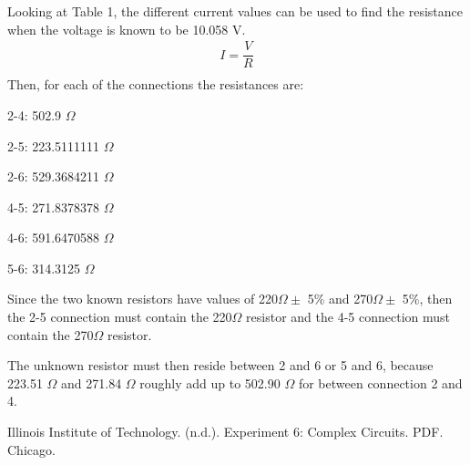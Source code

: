 \documentclass [12pt, letterpaper, twoside] {article}
\begin{document}
Looking at Table 1, the different current values can be used to find the resistance when the voltage is known to be 10.058 V.
\begin{equation}
  \begin{split}
    I = \dfrac{V}{R} \\
  \end{split}
\end{equation}
Then, for each of the connections the resistances are:

2-4: 502.9 \(\Omega\)

2-5: 223.5111111 \(\Omega\)

2-6: 529.3684211 \(\Omega\)

4-5: 271.8378378 \(\Omega\)

4-6: 591.6470588 \(\Omega\)

5-6: 314.3125 \(\Omega\)

Since the two known resistors have values of 220\(\Omega\pm\) 5\% and 270\(\Omega\pm\) 5\%, then the 2-5 connection must contain the 220\(\Omega\) resistor and the 4-5 connection must contain the 270\(\Omega\) resistor.

The unknown resistor must then reside between 2 and 6 or 5 and 6, because 223.51 \(\Omega\) and 271.84 \(\Omega\) roughly add up to 502.90 \(\Omega\) for between connection 2 and 4.

  Illinois Institute of Technology. (n.d.). Experiment 6: Complex Circuits. PDF. Chicago.
\end{document}

